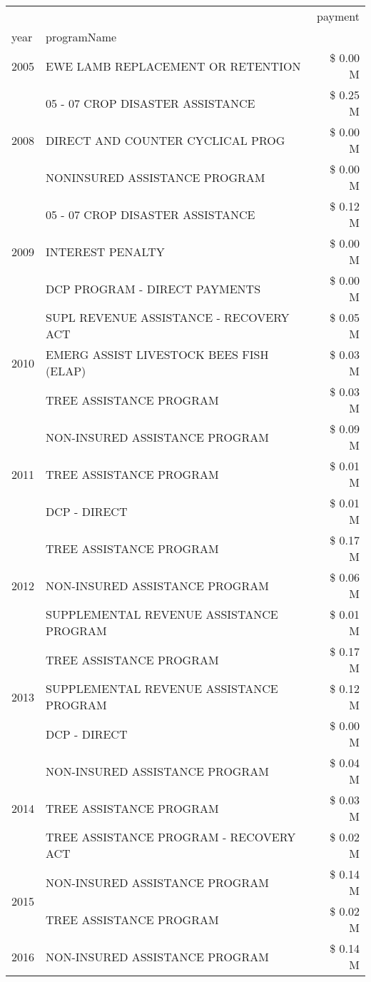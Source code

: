 \begin{tabular}{llr}
\toprule
 &  & payment \\
year & programName &  \\
\midrule
2005 & EWE LAMB REPLACEMENT OR RETENTION & \$ 0.00 M \\
\cline{1-3}
\multirow[t]{3}{*}{2008} & 05 - 07 CROP DISASTER ASSISTANCE & \$ 0.25 M \\
 & DIRECT AND COUNTER CYCLICAL PROG & \$ 0.00 M \\
 & NONINSURED ASSISTANCE PROGRAM & \$ 0.00 M \\
\cline{1-3}
\multirow[t]{3}{*}{2009} & 05 - 07 CROP DISASTER ASSISTANCE & \$ 0.12 M \\
 & INTEREST PENALTY & \$ 0.00 M \\
 & DCP PROGRAM - DIRECT PAYMENTS & \$ 0.00 M \\
\cline{1-3}
\multirow[t]{3}{*}{2010} & SUPL REVENUE ASSISTANCE - RECOVERY ACT & \$ 0.05 M \\
 & EMERG ASSIST LIVESTOCK BEES FISH (ELAP) & \$ 0.03 M \\
 & TREE ASSISTANCE PROGRAM & \$ 0.03 M \\
\cline{1-3}
\multirow[t]{3}{*}{2011} & NON-INSURED ASSISTANCE PROGRAM & \$ 0.09 M \\
 & TREE ASSISTANCE PROGRAM & \$ 0.01 M \\
 & DCP - DIRECT & \$ 0.01 M \\
\cline{1-3}
\multirow[t]{3}{*}{2012} & TREE ASSISTANCE PROGRAM & \$ 0.17 M \\
 & NON-INSURED ASSISTANCE PROGRAM & \$ 0.06 M \\
 & SUPPLEMENTAL REVENUE ASSISTANCE PROGRAM & \$ 0.01 M \\
\cline{1-3}
\multirow[t]{3}{*}{2013} & TREE ASSISTANCE PROGRAM & \$ 0.17 M \\
 & SUPPLEMENTAL REVENUE ASSISTANCE PROGRAM & \$ 0.12 M \\
 & DCP - DIRECT & \$ 0.00 M \\
\cline{1-3}
\multirow[t]{3}{*}{2014} & NON-INSURED ASSISTANCE PROGRAM & \$ 0.04 M \\
 & TREE ASSISTANCE PROGRAM & \$ 0.03 M \\
 & TREE ASSISTANCE PROGRAM - RECOVERY ACT & \$ 0.02 M \\
\cline{1-3}
\multirow[t]{2}{*}{2015} & NON-INSURED ASSISTANCE PROGRAM & \$ 0.14 M \\
 & TREE ASSISTANCE PROGRAM & \$ 0.02 M \\
\cline{1-3}
\multirow[t]{3}{*}{2016} & NON-INSURED ASSISTANCE PROGRAM & \$ 0.14 M \\

\end{tabular}
